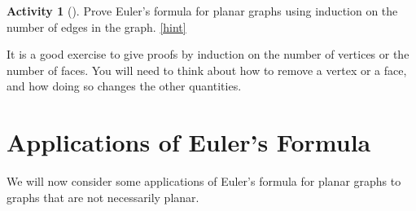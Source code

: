 \documentclass[10pt,]{book}
\theoremstyle{plain}
\theoremstyle{definition}
\theoremstyle{definition}
\theoremstyle{definition}
\newtheorem{activity}[project]{Activity}
\numberwithin{equation}{chapter}
\begin{document}
\begin{activity}[]\label{activity-20}
\hypertarget{p-257}{}%
Prove Euler's formula for planar graphs using induction on the number of edges in the graph.%
\hfill{\tiny\hyperlink{a-25}{[hint]}\hypertarget{q-25}{}}\end{activity}
\hypertarget{p-259}{}%
It is a good exercise to give proofs by induction on the number of vertices or the number of faces.  You will need to think about how to remove a vertex or a face, and how doing so changes the other quantities.%
\typeout{************************************************}
\typeout{************************************************}
\section[{Applications of Euler's Formula}]{Applications of Euler's Formula}\label{sec_eulerapps}
\hypertarget{p-260}{}%
We will now consider some applications of Euler's formula for planar graphs to graphs that are not necessarily planar.%
\typeout{************************************************}
\typeout{************************************************}
\end{document}
